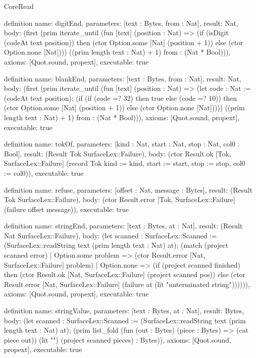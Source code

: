 \begin{lexlean}{CoreRead}
\begin{semanticmodule}
definition{
  name: digitEnd,
  parameters: [text : Bytes, from : Nat],
  result: Nat,
  body: (first (prim iterate_until (fun [text] (position : Nat) => (if (isDigit (codeAt text position)) then (ctor Option.some [Nat] (position + 1)) else (ctor Option.none [Nat]))) ((prim length text : Nat) + 1) from : (Nat * Bool))),
  axioms: [Quot.sound, propext],
  executable: true
}

definition{
  name: blankEnd,
  parameters: [text : Bytes, from : Nat],
  result: Nat,
  body: (first (prim iterate_until (fun [text] (position : Nat) => (let code : Nat := (codeAt text position); (if (if (code =? 32) then true else (code =? 10)) then (ctor Option.some [Nat] (position + 1)) else (ctor Option.none [Nat])))) ((prim length text : Nat) + 1) from : (Nat * Bool))),
  axioms: [Quot.sound, propext],
  executable: true
}

definition{
  name: tokOf,
  parameters: [kind : Nat, start : Nat, stop : Nat, col0 : Bool],
  result: (Result Tok SurfaceLex::Failure),
  body: (ctor Result.ok [Tok, SurfaceLex::Failure] (record Tok {kind := kind, start := start, stop := stop, col0 := col0})),
  executable: true
}

definition{
  name: refuse,
  parameters: [offset : Nat, message : Bytes],
  result: (Result Tok SurfaceLex::Failure),
  body: (ctor Result.error [Tok, SurfaceLex::Failure] (failure offset message)),
  executable: true
}

definition{
  name: stringEnd,
  parameters: [text : Bytes, at : Nat],
  result: (Result Nat SurfaceLex::Failure),
  body: (let scanned : SurfaceLex::Scanned := (SurfaceLex::readString text (prim length text : Nat) at); (match (project scanned error)
    | Option.some problem => (ctor Result.error [Nat, SurfaceLex::Failure] problem)
    | Option.none => (if (project scanned finished) then (ctor Result.ok [Nat, SurfaceLex::Failure] (project scanned pos)) else (ctor Result.error [Nat, SurfaceLex::Failure] (failure at (lit "unterminated string")))))),
  axioms: [Quot.sound, propext],
  executable: true
}

definition{
  name: stringValue,
  parameters: [text : Bytes, at : Nat],
  result: Bytes,
  body: (let scanned : SurfaceLex::Scanned := (SurfaceLex::readString text (prim length text : Nat) at); (prim list_fold (fun (out : Bytes) (piece : Bytes) => (cat piece out)) (lit "") (project scanned pieces) : Bytes)),
  axioms: [Quot.sound, propext],
  executable: true
}


\end{semanticmodule}
\end{lexlean}
